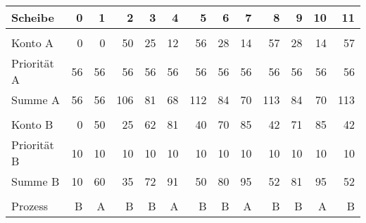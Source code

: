\documentclass{ti2}
\begin{document}
\begin{table}[htbp]
\begin{adjustbox}{max width=\textwidth}
\begin{tabular}{|l|r|r|r|r|r|r|r|r|r|r|r|r|}
\hline
Scheibe  & 0 & 1 & 2 & 3 & 4 & 5 & 6 & 7 & 8 & 9 & 10 & 11 \\ \hline
 & \multicolumn{1}{l|}{} & \multicolumn{1}{l|}{} & \multicolumn{1}{l|}{} & \multicolumn{1}{l|}{} & \multicolumn{1}{l|}{} & \multicolumn{1}{l|}{} & \multicolumn{1}{l|}{} & \multicolumn{1}{l|}{} & \multicolumn{1}{l|}{} & \multicolumn{1}{l|}{} & \multicolumn{1}{l|}{} & \multicolumn{1}{l|}{} \\ \hline
Konto A & 0 & 0 & 50 & 25 & 12 & 56 & 28 & 14 & 57 & 28 & 14 & 57 \\ \hline
Priorität A & 56 & 56 & 56 & 56 & 56 & 56 & 56 & 56 & 56 & 56 & 56 & 56 \\ \hline
Summe A & 56 & 56 & 106 & 81 & 68 & 112 & 84 & 70 & 113 & 84 & 70 & 113 \\ \hline
 & \multicolumn{1}{l|}{} & \multicolumn{1}{l|}{} & \multicolumn{1}{l|}{} & \multicolumn{1}{l|}{} & \multicolumn{1}{l|}{} & \multicolumn{1}{l|}{} & \multicolumn{1}{l|}{} & \multicolumn{1}{l|}{} & \multicolumn{1}{l|}{} & \multicolumn{1}{l|}{} & \multicolumn{1}{l|}{} & \multicolumn{1}{l|}{} \\ \hline
Konto B & 0 & 50 & 25 & 62 & 81 & 40 & 70 & 85 & 42 & 71 & 85 & 42 \\ \hline
Priorität B & 10 & 10 & 10 & 10 & 10 & 10 & 10 & 10 & 10 & 10 & 10 & 10 \\ \hline
Summe B & 10 & 60 & 35 & 72 & 91 & 50 & 80 & 95 & 52 & 81 & 95 & 52 \\ \hline
 & \multicolumn{1}{l|}{} & \multicolumn{1}{l|}{} & \multicolumn{1}{l|}{} & \multicolumn{1}{l|}{} & \multicolumn{1}{l|}{} & \multicolumn{1}{l|}{} & \multicolumn{1}{l|}{} & \multicolumn{1}{l|}{} & \multicolumn{1}{l|}{} & \multicolumn{1}{l|}{} & \multicolumn{1}{l|}{} & \multicolumn{1}{l|}{} \\ \hline
Prozess & B & A & B & B & A & B & B & A & B & B & A & B \\ \hline
\end{tabular}
\end{adjustbox}
\end{table}
\end{document}
